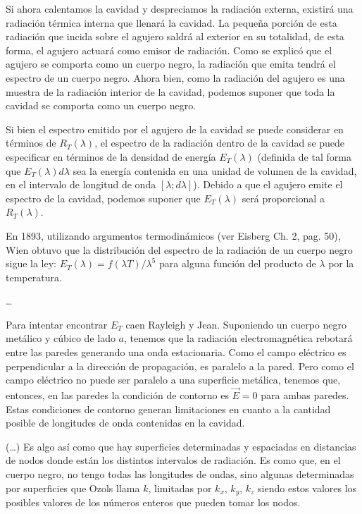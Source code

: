 \documentclass{article}
\begin{document}
Si ahora calentamos la cavidad y despreciamos la radiación externa, existirá una radiación térmica interna que llenará la cavidad. La pequeña porción de esta radiación que incida sobre el agujero saldrá al exterior en su totalidad, de esta forma, el agujero actuará como emisor de radiación. Como se explicó que el agujero se comporta como un cuerpo negro, la radiación que emita tendrá el espectro de un cuerpo negro. Ahora bien, como la radiación del agujero es una muestra de la radiación interior de la cavidad, podemos suponer que toda la cavidad se comporta como un cuerpo negro.

Si bien el espectro emitido por el agujero de la cavidad se puede considerar en términos de $R_{T}(\lambda)$, el espectro de la radiación dentro de la cavidad se puede especificar en términos de la densidad de energía $E_{T}(\lambda)$ (definida de tal forma que $E_{T}(\lambda) d\lambda$ sea la energía contenida en una unidad de volumen de la cavidad, en el intervalo de longitud de onda $ [ \lambda;d\lambda ]$). Debido a que el agujero emite el espectro de la cavidad, podemos suponer que $E_{T}(\lambda)$ será proporcional a $R_{T}(\lambda)$.

En 1893, utilizando argumentos termodinámicos (ver Eisberg Ch. 2, pag. 50), Wien obtuvo que la distribución del espectro de la radiación de un cuerpo negro sigue la ley: $E_{T}(\lambda) = f(\lambda T)/\lambda^{5}$ para alguna función del producto de $\lambda$ por la temperatura.

\ldots

Para intentar encontrar $E_{T}$ caen Rayleigh y Jean. Suponiendo un cuerpo negro metálico y cúbico de lado $a$, tenemos que la radiación electromagnética rebotará entre las paredes generando una onda estacionaria. Como el campo eléctrico es perpendicular a la dirección de propagación, es paralelo a la pared. Pero como el campo eléctrico no puede ser paralelo a una superficie metálica, tenemos que, entonces, en las paredes la condición de contorno es $\vec{E}=0$ para ambas paredes. Estas condiciones de contorno generan limitaciones en cuanto a la cantidad posible de longitudes de onda contenidas en la cavidad.

(\ldots) Es algo así como que hay superficies determinadas y espaciadas en distancias de nodos donde están los distintos intervalos de radiación. Es como que, en el cuerpo negro, no tengo todas las longitudes de ondas, sino algunas determinadas por superficies que Ozols llama $k$, limitadas por $k_{x}$, $k_{y}$, $k_{z}$ siendo estos valores los posibles valores de los números enteros que pueden tomar los nodos.
\end{document}

